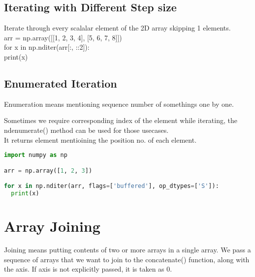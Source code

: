 \documentclass[openany]{book}
\begin{document}
\section{Iterating with Different Step size}
Iterate through every scalalar element of the 2D array skipping 1 elements.\\
arr = np.array([[1, 2, 3, 4], [5, 6, 7, 8]])\\

for x in np.nditer(arr[:, ::2]):\\
  print(x)

\section{Enumerated Iteration}
Enumeration means mentioning sequence number of somethings one by one.

Sometimes we require corresponding index of the element while iterating, the ndenumerate() method can be used for those usecases. \\
It returns element mentioining the position no. of each element. \\
\begin{lstlisting}[language=Python]
    import numpy as np

arr = np.array([1, 2, 3])

for x in np.nditer(arr, flags=['buffered'], op_dtypes=['S']):
  print(x)
\end{lstlisting}


\chapter{Array Joining}
Joining means putting contents of two or more arrays in a single array. We pass a sequence of arrays that we want to join to the concatenate() function, along with the axis. If axis is not explicitly passed, it is taken as 0. \\
\end{document}
